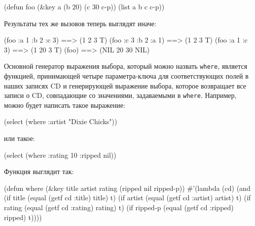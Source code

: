 \begin{myverb}
(defun foo (&key a (b 20) (c 30 c-p)) (list a b c c-p))
\end{myverb}

Результаты тех же вызовов теперь выглядят иначе:

\begin{myverb}
(foo :a 1 :b 2 :c 3)  ==> (1 2 3 T)
(foo :c 3 :b 2 :a 1)  ==> (1 2 3 T)
(foo :a 1 :c 3)       ==> (1 20 3 T)
(foo)                 ==> (NIL 20 30 NIL)
\end{myverb}

Основной генератор выражения выбора, который можно назвать \lstinline{where}, является
функцией, принимающей четыре параметра-ключа для соответствующих полей в наших записях CD
и генерирующей выражение выбора, которое возвращает все записи о CD, совпадающие со
значениями, задаваемыми в \lstinline{where}. Например, можно будет написать такое выражение:

\begin{myverb}
(select (where :artist "Dixie Chicks"))
\end{myverb}

\noindent{}или такое:

\begin{myverb}
(select (where :rating 10 :ripped nil))
\end{myverb}

Функция выглядит так:

\begin{myverb}
(defun where (&key title artist rating (ripped nil ripped-p))
  #'(lambda (cd)
    (and
      (if title    (equal (getf cd :title)  title)  t)
      (if artist   (equal (getf cd :artist) artist) t)
      (if rating   (equal (getf cd :rating) rating) t)
      (if ripped-p (equal (getf cd :ripped) ripped) t))))
\end{myverb}

